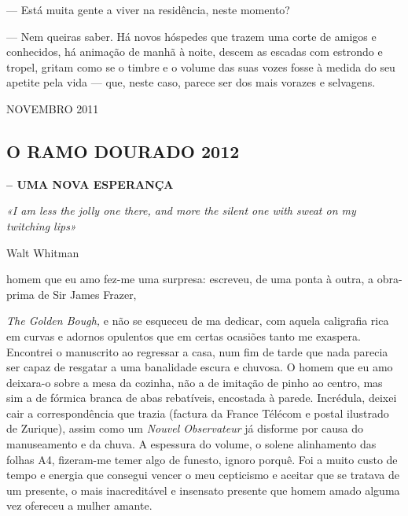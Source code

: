 --- Está muita gente a viver na residência, neste momento?

--- Nem queiras saber. Há novos hóspedes que trazem uma corte de amigos e
  conhecidos, há animação de manhã à
noite, descem as escadas com estrondo e tropel, gritam como se o timbre
e o volume das suas vozes fosse à medida do seu apetite pela vida ---
que, neste caso, parece ser dos mais vorazes e selvagens.

NOVEMBRO 2011

\subsection{O RAMO DOURADO 2012}

\textbf{-- UMA NOVA ESPERANÇA}

\emph{«I am less the jolly one there, and more the silent one with sweat
on my twitching lips»}

Walt Whitman

homem que eu amo fez-me uma surpresa: escreveu, de uma ponta à outra, a
obra-prima de Sir James Frazer,

\emph{The Golden Bough, }e não se esqueceu de ma dedicar, com aquela
caligrafia rica em curvas e adornos opulentos que em certas ocasiões
tanto me exaspera. Encontrei o manuscrito ao regressar a casa, num fim
de tarde que nada parecia ser capaz de resgatar a uma banalidade escura
e chuvosa. O homem que eu amo deixara-o sobre a mesa da cozinha, não a
de imitação de pinho ao centro, mas sim a de fórmica branca de abas
rebatíveis, encostada à parede. Incrédula, deixei cair a correspondência que trazia (factura da France Télécom e postal ilustrado de
Zurique), assim como um \emph{Nouvel Observateur }já disforme por causa
do manuseamento e da chuva. A espessura do volume, o solene
alinhamento das folhas A4, fizeram-me temer algo de funesto, ignoro porquê. Foi a muito custo de tempo e
energia que consegui vencer o meu cepticismo e aceitar que se tratava de
um presente, o mais inacreditável e insensato presente que homem amado
alguma vez ofereceu a mulher amante.

